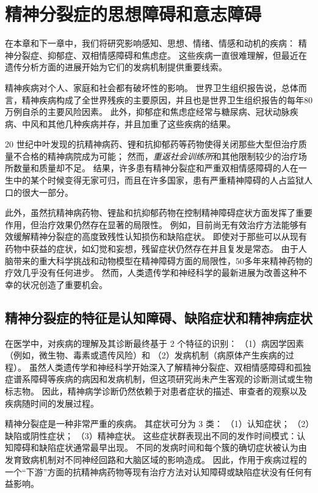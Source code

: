 \chapter{精神分裂症的思想障碍和意志障碍} \label{chap:chap60}

在本章和下一章中，我们将研究影响感知、思想、情绪、情感和动机的疾病：
精神分裂症、抑郁症、双相情感障碍和焦虑症。
这些疾病一直很难理解，但最近在遗传分析方面的进展开始为它们的发病机制提供重要线索。


精神疾病对个人、家庭和社会都有破坏性的影响。
世界卫生组织报告说，总体而言，精神疾病构成了全世界残疾的主要原因，并且也是世界卫生组织报告的每年80万例自杀的主要风险因素。
此外，抑郁症和焦虑症经常与糖尿病、冠状动脉疾病、中风和其他几种疾病并存，并且加重了这些疾病的结果。


20 世纪中叶发现的抗精神病药、锂和抗抑郁药等药物使得关闭那些大型但治疗质量不合格的精神病院成为可能；
然而，\textit{重返社会训练所}和其他限制较少的治疗场所数量和质量却不足。
结果，许多患有精神分裂症和严重双相情感障碍的人在一生中的某个时候变得无家可归，而且在许多国家，患有严重精神障碍的人占监狱人口的很大一部分。


此外，虽然抗精神病药物、锂盐和抗抑郁药物在控制精神障碍症状方面发挥了重要作用，但治疗效果仍然存在显著的局限性。
例如，目前尚无有效治疗方法能够有效缓解精神分裂症的高度致残性认知损伤和缺陷症状。
即使对于那些可以从现有药物中获益的症状，如幻觉和妄想，残留症状仍然存在并且复发是常态。
由于人脑带来的重大科学挑战和动物模型在精神障碍方面的局限性，50多年来精神药物的疗效几乎没有任何进步。
然而，人类遗传学和神经科学的最新进展为改善这种不幸的状况创造了重要机会。



\section{精神分裂症的特征是认知障碍、缺陷症状和精神病症状}

在医学中，对疾病的理解及其诊断最终基于 2 个特征的识别：
（1）病因学因素（例如，微生物、毒素或遗传风险）和 
（2）发病机制（病原体产生疾病的过程）。
虽然人类遗传学和神经科学开始深入了解精神分裂症、双相情感障碍和孤独症谱系障碍等疾病的病因和发病机制，但这项研究尚未产生客观的诊断测试或生物标志物。
因此，精神病学诊断仍然依赖于对患者症状的描述、审查者的观察以及疾病随时间的发展过程。


精神分裂症是一种非常严重的疾病。
其症状可分为 3 类：
（1）认知症状； 
（2）缺陷或阴性症状； 
（3）精神症状。
这些症状群表现出不同的发作时间模式：认知障碍和缺陷症状通常最早出现。
不同的发病时间和每个簇的确切症状被认为由发育致病机制对不同神经回路和大脑区域的影响造成。
因此，作用于疾病过程的一个“下游”方面的抗精神病药物等现有治疗方法对认知障碍或缺陷症状没有任何有益影响。



